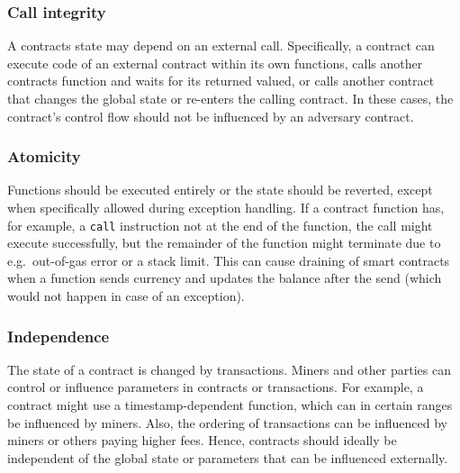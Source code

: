 \subsubsection{Call integrity}
A contracts state may depend on an external call. Specifically, a contract can execute code of an external contract within its own functions, calls another contracts function and waits for its returned valued, or calls another contract that changes the global state or re-enters the calling contract.
In these cases, the contract's control flow should not be influenced by an adversary contract.

\subsubsection{Atomicity}
Functions should be executed entirely or the state should be reverted, except when specifically allowed during exception handling.
If a contract function has, for example, a \texttt{call} instruction not at the end of the function, the call might execute successfully, but the remainder of the function might terminate due to e.g.\ out-of-gas error or a stack limit. This can cause draining of smart contracts when a function sends currency and updates the balance after the send (which would not happen in case of an exception).

\subsubsection{Independence}
The state of a contract is changed by transactions. Miners and other parties can control or influence parameters in contracts or transactions. For example, a contract might use a timestamp-dependent function, which can in certain ranges be influenced by miners. Also, the ordering of transactions can be influenced by miners or others paying higher fees. Hence, contracts should ideally be independent of the global state or parameters that can be influenced externally.









